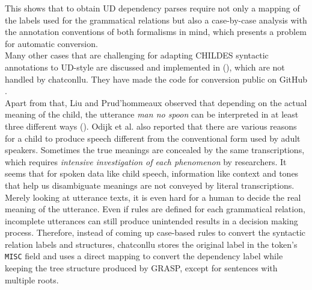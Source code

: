 This shows that to obtain UD dependency parses require not only a mapping of the labels used for the grammatical relations but also a case-by-case analysis with the annotation conventions of both formalisms in mind, which presents a problem for automatic conversion.\\

Many other cases that are challenging for adapting CHILDES syntactic annotations to UD-style are discussed and implemented in (\cite{liu2021}), which are not handled by chatconllu. They have made the code for conversion public on GitHub .\\

Apart from that, Liu and Prud’hommeaux observed that depending on the actual meaning of the child, the utterance \emph{man no spoon} can be interpreted in at least three different ways (\cite{liu2021}). Odijk et al. also reported that there are various reasons for a child to produce speech different from the conventional form used by adult speakers. Sometimes the true meanings are concealed by the same transcriptions, which requires \emph{intensive investigation of each phenomenon} by researchers. It seems that for spoken data like child speech, information like context and tones that help us disambiguate meanings are not conveyed by literal transcriptions. Merely looking at utterance texts, it is even hard for a human to decide the real meaning of the utterance. Even if rules are defined for each grammatical relation, incomplete utterances can still produce unintended results in a decision making process. Therefore, instead of coming up case-based rules to convert the syntactic relation labels and structures, chatconllu stores the original label in the token's \texttt{MISC} field and uses a direct mapping to convert the dependency label while keeping the tree structure produced by GRASP, except for sentences with multiple roots.


